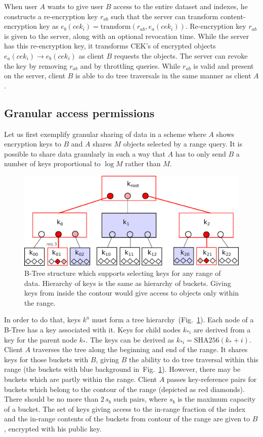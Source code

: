 \documentclass[notitlepage,longbibliography]{revtex4-1}
\newcommand{\figref}[1]{Fig.~\ref{#1}}
\begin{document}
When user $A$ wants to give user $B$ access to the entire dataset and indexes, he constructs a re-encryption key $r_{ab}$ such that
the server can transform content-encryption key as $e_b(cek_i) = \mbox{transform}(r_{ab}, e_a(cek_i))$.
Re-encryption key $r_{ab}$ is given to the server, along with an optional revocation time.
While the server has this re-encryption key, it transforms CEK's of encrypted objects $e_a(cek_i) \rightarrow e_b(cek_i)$ as client $B$ requests the objects.
The server can revoke the key by removing $r_{ab}$ and by throttling queries.
While $r_{ab}$ is valid and present on the server, client $B$ is able to do tree traversals in the same manner as client $A$.

\subsection{Granular access permissions}

Let us first exemplify granular sharing of data in a scheme where $A$ shows encryption keys to $B$ and $A$ shares $M$ objects selected by a range query.
It is possible to share data granularly in such a way that $A$ has to only send $B$ a number of keys proportional to $\log{M}$ rather than $M$.

\begin{figure}
    \begin{center}
        \includegraphics[width=0.7\columnwidth]{keytree.pdf}
    \end{center}
    \caption{
        B-Tree structure which supports selecting keys for any range of data.
        Hierarchy of keys is the same as hierarchy of buckets.
        Giving keys from inside the contour would give access to objects only within the range.
    }
    \label{fig:keytree}
\end{figure}

In order to do that, keys $k^a$ must form a tree hierarchy~(\figref{fig:keytree}).
Each node of a B-Tree has a key associated with it.
Keys for child nodes $k_{*i}$ are derived from a key for the parent node $k_*$.
The keys can be derived as $k_{*i} = \mbox{SHA256}(k_* + i)$.
Client $A$ traverses the tree along the beginning and end of the range.
It shares keys for those buckets with $B$, giving $B$ the ability to do tree traversal within this range (the buckets with blue background in~\figref{fig:keytree}).
However, there may be buckets which are partly within the range.
Client $A$ passes key-reference pairs for buckets which belong to the contour of the range (depicted as red diamonds).
There should be no more than $2\,s_b$ such pairs, where $s_b$ is the maximum capacity of a bucket.
The set of keys giving access to the in-range fraction of the index and the in-range contents of the buckets from contour of the range are given to $B$, encrypted with his public key.
\end{document}

